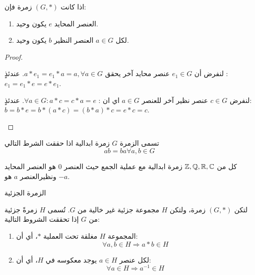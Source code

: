 \begin{theorem}
	اذا كانت $(G, *)$ زمرة فإن:
	\begin{enumerate}[label=(\alph*)]
		\item العنصر المحايد $e$ يكون وحيد.
		\item لكل $a\in G$ العنصر النظير $b$ يكون وحيد.
	\end{enumerate}
\end{theorem}
\begin{proof}
	\begin{tasks*}
		\item لنفرض أن $e_1 \in G$ عنصر محايد آخر يحقق $a * e_1 = e_1 * a = a, \forall a\in G$. عندئذٍ :\linebreak $e_1 = e_1 * e = e*e_1$.
		\item لنفرض $c\in G$ عنصر نظير آخر للعنصر $a\in G$ اي ان : 
		$\forall a \in G  : a * c= c*a = e$. عندئذٍ:\linebreak
		$b = b*e = b*(a*c) = (b*a) * c = e*c = c$.
	\end{tasks*}
\end{proof}

\begin{note}
	تسمى الزمرة $G$ زمرة ابدالية اذا حققت الشرط التالي
	\[
	ab = ba \forall a, b\in G
	\]
\end{note}

\begin{example}
	كل من
	$\mathbb{Z}, \mathbb{Q}, \mathbb{R}, \mathbb{C}$ زمرة ابدالية مع عملية الجمع حيث العنصر $0$ هو العنصر المحايد ونظير\linebreak العنصر $a$ هو $-a$.
\end{example}

\begin{definition}{الزمرة الجزئية}{\cite{ref3}}\\
	لتكن $(G, *)$ زمرة، ولتكن $H$ مجموعة جزئية غير خالية من $G$. تُسمى $H$ زمرةً جزئية من $G$ إذا تحققت الشروط التالية:
	\begin{enumerate}
		\item المجموعة $H$ مغلقة تحت العملية $*$، أي أن:
		\[
		\forall a, b \in H \Rightarrow a * b \in H
		\]
		
		\item لكل عنصر $a \in H$ يوجد معكوسه في $H$، أي أن:
		\[
		\forall a \in H \Rightarrow a^{-1} \in H
		\]
	\end{enumerate}
\end{definition}

